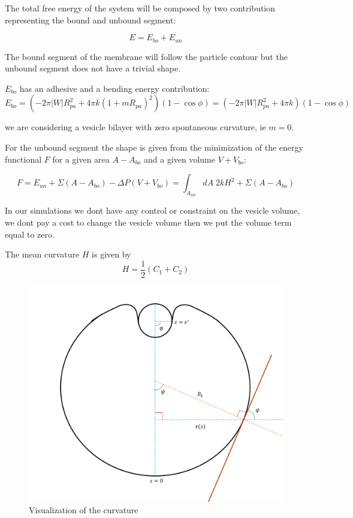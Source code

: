 \documentclass[12pt]{article}
\begin{document}
The total free energy of the system will be composed by two contribution representing the bound and unbound segment:

$$
E = E_{bo} + E_{un}
$$

The bound segment of the membrane will follow the particle contour but the unbound segment does not have a trivial shape.

$E_{bo}$ has an adhesive and a bending energy contribution: \cite{agudo-canalejoCriticalParticleSizes2015}
$$
E_{bo} = (-2 \pi |W| R_{pa}^2 + 4 \pi k(1+m R_{pa})^2)(1-\cos \phi) = (-2 \pi |W| R_{pa}^2 + 4 \pi k)(1-\cos \phi)
$$

we are considering a vesicle bilayer with zero spontaneous curvature, ie $m=0$.

For the unbound segment the shape is given from the minimization of the energy functional $F$ for a given area $A-A_{bo}$ and a given volume $V+V_{bo}$:

$$
F = E_{un} + \Sigma(A-A_{bo}) - \Delta P (V+V_{bo}) = \int_{A_{un}} dA \; 2kH^2  + \Sigma(A-A_{bo})
$$

In our simulations we dont have any control or constraint on the vesicle volume, we dont pay a cost to change the vesicle volume then we put the volume term equal to zero.





\color{gray}
The mean curvature $H$ is given by 
$$H=\frac{1}{2}(C_1+C_2)$$

\begin{figure}[ht]
  \begin{center}
      \includegraphics[width=0.8\linewidth]{img/shape_equation_schematic.png}
      \caption{Visualization of the curvature}
  \end{center}
  \label{fig:figure2}
\end{figure}
\end{document}
